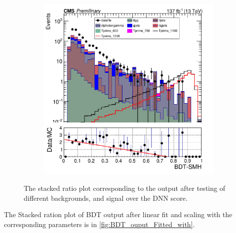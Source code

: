 \begin{figure}[H]
\begin{subfigure}[b]{0.3\textwidth}
         \label{fig:three sin x}
     \end{subfigure}
     \hfill
     \begin{subfigure}[b]{0.3\textwidth}
         \centering
         \includegraphics[width=\textwidth]{BDT_Output/Stacked_plot_BDT_1100-1200_with_diphoton_cuts_inputs.pdf}
         \label{fig:three sin x}
     \end{subfigure}
        \caption{The stacked ratio plot corresponding to the output after testing of different backgrounds, and signal over the DNN score.}
        \label{fig:plots}
\end{figure}


The Stacked ration plot of BDT output after linear fit and scaling with the corresponding parameters is in \autoref{fig:BDT_ouput_Fitted_with}.

